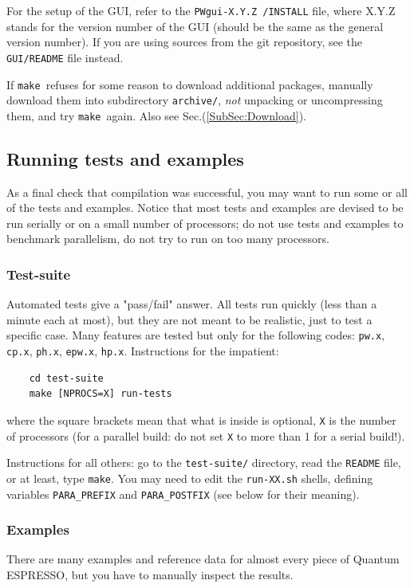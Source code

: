 \documentclass[12pt,a4paper]{article}
\def\qe{{\sc Quantum ESPRESSO}}
\def\pwx{\texttt{pw.x}}
\def\cpx{\texttt{cp.x}}
\def\phx{\texttt{ph.x}}
\def\epwx{\texttt{epw.x}}
\def\make{\texttt{make}}
\begin{document}
For the setup of the GUI, refer to the \texttt{PWgui-X.Y.Z /INSTALL} file, where
X.Y.Z stands for the version number of the GUI (should be the same as the
general version number). If you are using sources from the git repository, see
the \texttt{GUI/README} file instead.

If \make\ refuses for some reason to download additional
packages, manually download them into subdirectory
\texttt{archive/}, {\em not} unpacking or uncompressing them,
and try \make\ again. Also see Sec.(\ref{SubSec:Download}).

\subsection{Running tests and examples}
\label{SubSec:TestsExamples}

As a final check that compilation was successful, you may want to run some or
all of the tests and examples.
Notice that most tests and examples are devised to be run serially
or on a small number of processors; do not use tests and examples
to benchmark parallelism, do not try to run on too many processors.

\subsubsection{Test-suite}
Automated tests give a "pass/fail" answer. All tests run quickly
(less than a minute each at most), but they are not meant to be realistic,
just to test a specific case. Many features are tested but only for
the following codes: \pwx, \cpx, \phx, \epwx, \texttt{hp.x}.
Instructions for the impatient:
\begin{verbatim}
    cd test-suite
    make [NPROCS=X] run-tests
\end{verbatim}
where the square brackets mean that what is inside is optional, \texttt{X} 
is the number of processors (for a parallel build: do not set \texttt{X}
to more than 1 for a serial build!).

Instructions for all others: go to the \texttt{test-suite/} directory,
read the \texttt{README} file, or at least, type \make. You may need
to edit the \texttt{run-XX.sh} shells, defining variables
\texttt{PARA\_PREFIX} and \texttt{PARA\_POSTFIX} (see below for their
meaning).

\subsubsection{Examples}
\label{SubSec:Examples}
There are many examples and reference data for almost every piece of \qe,
but you have to manually inspect the results.
\end{document}
